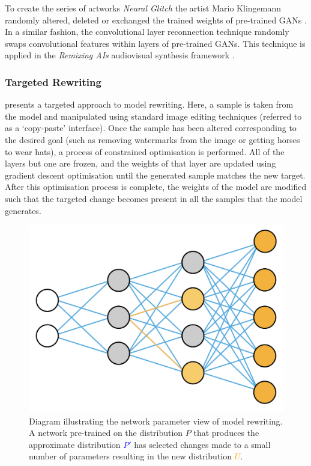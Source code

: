 To create the series of artworks \textit{Neural Glitch} the artist Mario Klingemann randomly altered, deleted or exchanged the trained weights of pre-trained GANs \citep{klingemann2018neural}. 
In a similar fashion, the convolutional layer reconnection technique \citep{ruzika2020gan} randomly swaps convolutional features within layers of pre-trained GANs. 
This technique is applied in the \textit{Remixing AIs} audiovisual synthesis framework \citep{collins2020remixing}.

\subsubsection{Targeted Rewriting} 
\citet{bau2020rewriting} presents a targeted approach to model rewriting. 
Here, a sample is taken from the model and manipulated using standard image editing techniques (referred to as a `copy-paste' interface). 
Once the sample has been altered corresponding to the desired goal (such as removing watermarks from the image or getting horses to wear hats), a process of constrained optimisation is performed. 
All of the layers but one are frozen, and the weights of that layer are updated using gradient descent optimisation until the generated sample matches the new target. 
After this optimisation process is complete, the weights of the model are modified such that the targeted change becomes present in all the samples that the model generates.

\begin{figure}[!htbp]
    \centering
    \includegraphics[width=1\textwidth]{figures/c6_active_div/diagrams/model_rewriting.png}
    \caption[Diagram illustrating the network parameter view of model rewriting.]{Diagram illustrating the network parameter view of model rewriting. A network pre-trained on the distribution $P$ that produces the approximate distribution \textcolor{blue}{$P'$} has selected changes made to a small number of parameters resulting in the new distribution \textcolor{orange}{$U$}.}
  \label{fig:c6:model-rewriting}
  \end{figure}

